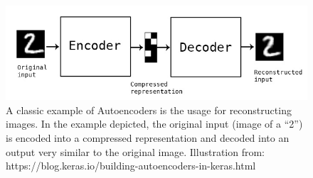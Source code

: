 \begin{figure}
  \begin{center}
    \includegraphics[scale=1, width=1\textwidth]{pictures/ML_autoencoder_schema.jpeg}
  \end{center}
  \caption[VirusTimeline]{A classic example of Autoencoders is the usage for reconstructing images. In the example depicted, the original input (image of a “2”) is encoded into a compressed representation and decoded into an output very similar to the original image. Illustration from: https://blog.keras.io/building-autoencoders-in-keras.html
  }
  \label{fig:encodedecode}
\end{figure}

